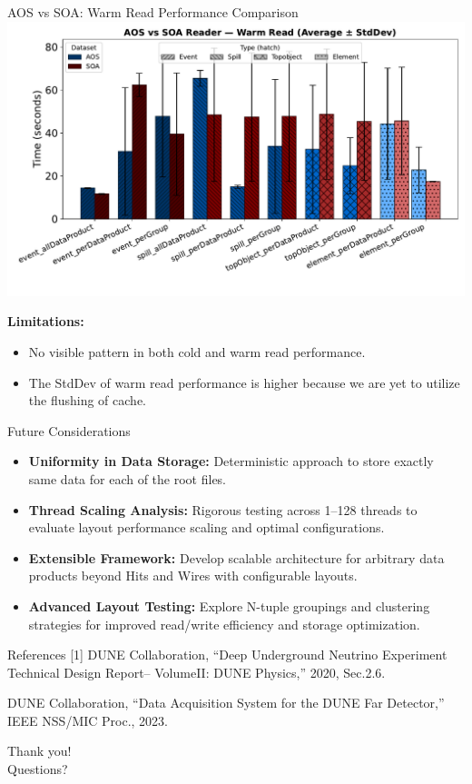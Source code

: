 \documentclass[aspectratio=169]{beamer}
\begin{document}
\begin{frame}{AOS vs SOA: Warm Read Performance Comparison}
  \centering
  \includegraphics[width=0.5\linewidth]{../experiments/Seaborn/AOS_SOA_Reader_Warm_grouped.pdf}
  
  \textbf{Limitations:}
  \begin{itemize}
  \item No visible pattern in both cold and warm read performance.
  \item The StdDev of warm read performance is higher because we are yet to utilize the flushing of cache.
  \end{itemize}
  \end{frame}


\begin{frame}{Future Considerations}
\begin{itemize}

  \item \textbf{Uniformity in Data Storage:} Deterministic approach to store exactly same data for each of the root files.

  \vspace{0.5em}

  \item \textbf{Thread Scaling Analysis:} Rigorous testing across 1--128 threads to evaluate layout performance scaling and optimal configurations.
  
  \vspace{0.5em}
  
  \item \textbf{Extensible Framework:} Develop scalable architecture for arbitrary data products beyond Hits and Wires with configurable layouts.
  
  \vspace{0.5em}
  
  \item \textbf{Advanced Layout Testing:} Explore N-tuple groupings and clustering strategies for improved read/write efficiency and storage optimization.
\end{itemize}
\end{frame}

\begin{frame}[allowframebreaks]{References}
\small
[1] DUNE Collaboration, “Deep Underground Neutrino Experiment Technical Design Report– VolumeII: DUNE Physics,” 2020, Sec.2.6.\par
[2] DUNE Collaboration, “Data Acquisition System for the DUNE Far Detector,” IEEE NSS/MIC Proc., 2023.\\
\end{frame}

\begin{frame}[standout]
Thank you! \\
Questions?
\end{frame}
\end{document}
